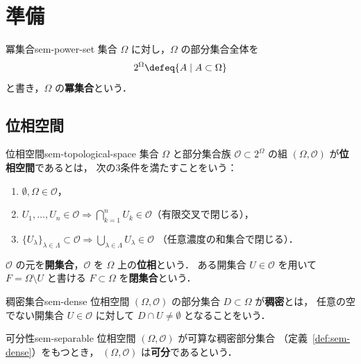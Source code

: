 \chapter{準備}
\label{ch:seminar-00}

\begin{definition}{冪集合}{sem-power-set}
  集合 $\Omega$ に対し，$\Omega$ の部分集合全体を
  \[
    2^{\Omega} \defeq \{A \mid A \subset \Omega\}
  \]
  と書き，$\Omega$ の\textbf{冪集合}という．
\end{definition}

\section{位相空間}
\label{sec:sem-topology}

\begin{definition}{位相空間}{sem-topological-space}
  集合 $\Omega$ と部分集合族 $\mathcal{O} \subset 2^{\Omega}$ の組
  $(\Omega, \mathcal{O})$ が\textbf{位相空間}であるとは，
  次の3条件を満たすことをいう：
  \begin{enumerate}
    \item[(i)] $\emptyset, \Omega \in \mathcal{O}$，
    \item[(ii)] $U_1, \ldots, U_n \in \mathcal{O} \Longrightarrow
      \bigcap_{k=1}^{n} U_k \in \mathcal{O}$（有限交叉で閉じる），
    \item[(iii)] $\{U_\lambda\}_{\lambda \in \Lambda} \subset \mathcal{O}
      \Longrightarrow \bigcup_{\lambda \in \Lambda} U_\lambda \in \mathcal{O}$
      （任意濃度の和集合で閉じる）．
  \end{enumerate}
  $\mathcal{O}$ の元を\textbf{開集合}，$\mathcal{O}$ を $\Omega$ 上の\textbf{位相}という．
  ある開集合 $U \in \mathcal{O}$ を用いて $F = \Omega \setminus U$ と書ける
  $F \subset \Omega$ を\textbf{閉集合}という．
\end{definition}

\begin{definition}{稠密集合}{sem-dense}
  位相空間 $(\Omega, \mathcal{O})$ の部分集合 $D \subset \Omega$ が\textbf{稠密}とは，
  任意の空でない開集合 $U \in \mathcal{O}$ に対して $D \cap U \neq \emptyset$
  となることをいう．
\end{definition}

\begin{definition}{可分性}{sem-separable}
  位相空間 $(\Omega, \mathcal{O})$ が可算な稠密部分集合
  （定義~\ref{def:sem-dense}）をもつとき，
  $(\Omega, \mathcal{O})$ は\textbf{可分}であるという．
\end{definition}

